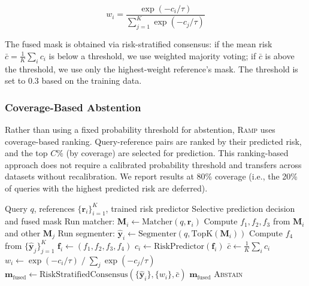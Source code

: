 \documentclass[11pt]{article}
\newcommand{\RAMP}{\textsc{Ramp}}
\begin{document}
\begin{equation}
w_i = \frac{\exp(-c_i / \tau)}{\sum_{j=1}^K \exp(-c_j / \tau)}
\end{equation}

The fused mask is obtained via risk-stratified consensus: if the mean risk
$\bar{c} = \frac{1}{K}\sum_i c_i$ is below a threshold, we use weighted
majority voting; if $\bar{c}$ is above the threshold, we use only the
highest-weight reference's mask. The threshold is set to 0.3 based on the
training data.

\subsubsection{Coverage-Based Abstention}

Rather than using a fixed probability threshold for abstention, \RAMP{} uses
coverage-based ranking. Query-reference pairs are ranked by their predicted
risk, and the top $C\%$ (by coverage) are selected for prediction. This
ranking-based approach does not require a calibrated probability threshold
and transfers across datasets without recalibration. We report results at
80\% coverage (i.e., the 20\% of queries with the highest predicted risk are
deferred).

\begin{algorithm}[t]
\caption{\RAMP: Post-hoc Selective Prediction}
\label{alg:ramp}
\begin{algorithmic}[1]
\Require Query $q$, references $\{\mathbf{r}_i\}_{i=1}^K$, trained risk predictor
\Ensure Selective prediction decision and fused mask
    \State Run matcher: $\mathbf{M}_i \gets \text{Matcher}(q, \mathbf{r}_i)$
    \State Compute $f_1, f_2, f_3$ from $\mathbf{M}_i$ and other $\mathbf{M}_j$
    \State Run segmenter: $\hat{\mathbf{y}}_i \gets \text{Segmenter}(q, \text{TopK}(\mathbf{M}_i))$
\EndFor
{}
    \State Compute $f_4$ from $\{\hat{\mathbf{y}}_j\}_{j=1}^K$
    \State $\mathbf{f}_i \gets (f_1, f_2, f_3, f_4)$
    \State $c_i \gets \text{RiskPredictor}(\mathbf{f}_i)$
\EndFor
\State $\bar{c} \gets \frac{1}{K}\sum_i c_i$
\State $w_i \gets \exp(-c_i / \tau) \;/\; \sum_j \exp(-c_j / \tau)$
\State $\mathbf{m}_{\text{fused}} \gets \text{RiskStratifiedConsensus}(\{\hat{\mathbf{y}}_i\}, \{w_i\}, \bar{c})$
    \State \Return $\mathbf{m}_{\text{fused}}$
\Else
    \State \Return \textsc{Abstain}
\EndIf
\end{algorithmic}
\end{algorithm}
\end{document}
